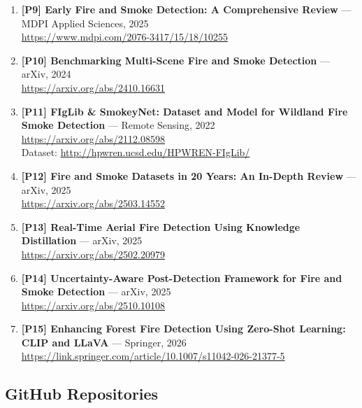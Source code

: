 \documentclass[11pt,twocolumn]{article}
\begin{document}
\begin{enumerate}[leftmargin=*, itemsep=4pt]
    \item \textbf{[P9] Early Fire and Smoke Detection: A Comprehensive
          Review} --- MDPI Applied Sciences, 2025\\
          \url{https://www.mdpi.com/2076-3417/15/18/10255}

    \item \textbf{[P10] Benchmarking Multi-Scene Fire and Smoke
          Detection} --- arXiv, 2024\\
          \url{https://arxiv.org/abs/2410.16631}

    \item \textbf{[P11] FIgLib \& SmokeyNet: Dataset and Model for
          Wildland Fire Smoke Detection} --- Remote Sensing, 2022\\
          \url{https://arxiv.org/abs/2112.08598}\\
          Dataset: \url{http://hpwren.ucsd.edu/HPWREN-FIgLib/}

    \item \textbf{[P12] Fire and Smoke Datasets in 20 Years:
          An In-Depth Review} --- arXiv, 2025\\
          \url{https://arxiv.org/abs/2503.14552}

    \item \textbf{[P13] Real-Time Aerial Fire Detection Using
          Knowledge Distillation} --- arXiv, 2025\\
          \url{https://arxiv.org/abs/2502.20979}

    \item \textbf{[P14] Uncertainty-Aware Post-Detection Framework
          for Fire and Smoke Detection} --- arXiv, 2025\\
          \url{https://arxiv.org/abs/2510.10108}

    \item \textbf{[P15] Enhancing Forest Fire Detection Using
          Zero-Shot Learning: CLIP and LLaVA} --- Springer, 2026\\
          \url{https://link.springer.com/article/10.1007/s11042-026-21377-5}

\end{enumerate}

\subsection*{GitHub Repositories}
\end{document}
